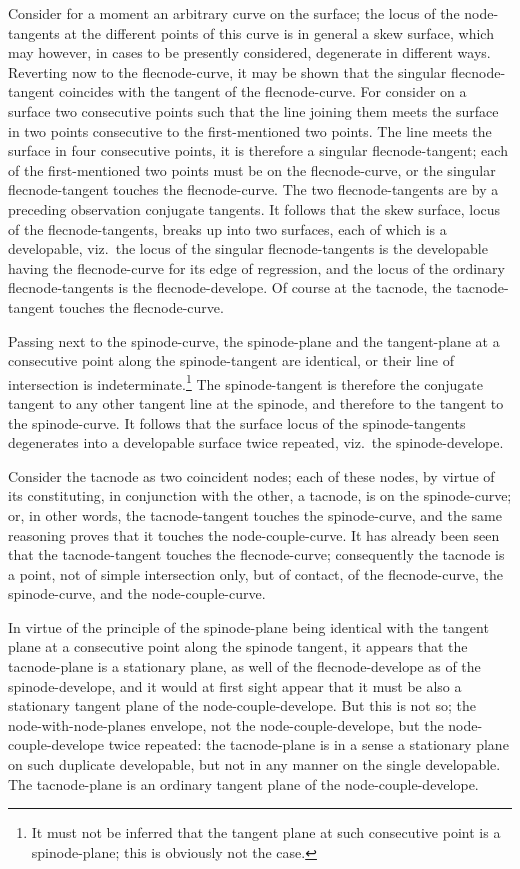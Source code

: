 \documentclass[11pt,a4paper]{article}
\theoremstyle{plain}
\begin{document}
Consider for a moment an arbitrary curve on the surface; the locus of the node-tangents at the different points of this curve is in general a skew surface, which may however, in cases to be presently considered, degenerate in different ways. Reverting now to the flecnode-curve, it may be shown that the singular flecnode-tangent coincides with the tangent of the flecnode-curve. For consider on a surface two consecutive points such that the line joining them meets the surface in two points consecutive to the first-mentioned two points. The line meets the surface in four consecutive points, it is therefore a singular flecnode-tangent; each of the first-mentioned two points must be on the flecnode-curve, or the singular flecnode-tangent touches the flecnode-curve. The two flecnode-tangents are by a preceding observation conjugate tangents. It follows that the skew surface, locus of the flecnode-tangents, breaks up into two surfaces, each of which is a developable, viz.\ the locus of the singular flecnode-tangents is the developable having the flecnode-curve for its edge of regression, and the locus of the ordinary flecnode-tangents is the flecnode-develope. Of course at the tacnode, the tacnode-tangent touches the flecnode-curve.

Passing next to the spinode-curve, the spinode-plane and the tangent-plane at a consecutive point along the spinode-tangent are identical, or their line of intersection is indeterminate.\footnote{It must not be inferred that the tangent plane at such consecutive point is a spinode-plane; this is obviously not the case.} The spinode-tangent is therefore the conjugate tangent to any other tangent line at the spinode, and therefore to the tangent to the spinode-curve. It follows that the surface locus of the spinode-tangents degenerates into a developable surface twice repeated, viz.\ the spinode-develope.

Consider the tacnode as two coincident nodes; each of these nodes, by virtue of its constituting, in conjunction with the other, a tacnode, is on the spinode-curve; or, in other words, the tacnode-tangent touches the spinode-curve, and the same reasoning proves that it touches the node-couple-curve. It has already been seen that the tacnode-tangent touches the flecnode-curve; consequently the tacnode is a point, not of simple intersection only, but of contact, of the flecnode-curve, the spinode-curve, and the node-couple-curve.

In virtue of the principle of the spinode-plane being identical with the tangent plane at a consecutive point along the spinode tangent, it appears that the tacnode-plane is a stationary plane, as well of the flecnode-develope as of the spinode-develope, and it would at first sight appear that it must be also a stationary tangent plane of the node-couple-develope. But this is not so; the node-with-node-planes envelope, not the node-couple-develope, but the node-couple-develope twice repeated: the tacnode-plane is in a sense a stationary plane on such duplicate developable, but not in any manner on the single developable. The tacnode-plane is an ordinary tangent plane of the node-couple-develope.
\end{document}
